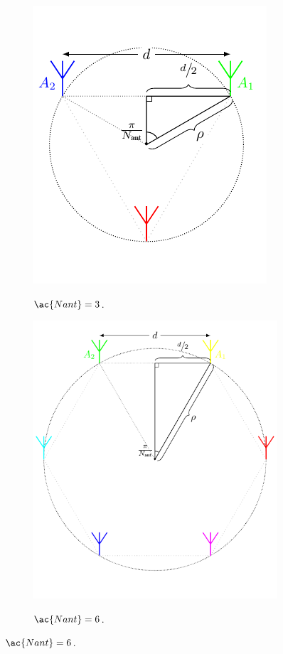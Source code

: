 \begin{figure}[htbp]
    \centering
    \caption{Diferentes distribuições de antenas.}
    \label{fig:antennas}

    \hfill
    \begin{subfigure}[c]{0.4\textwidth}
        \centering
        \caption{$ \ac{Nant} = 3 $.}
        \includegraphics{../pictures/antennas_3.pdf}
        \label{fig:antennas:3}
    \end{subfigure}
    \hfill
    \begin{subfigure}[c]{0.575\textwidth}
        \centering
        \caption{$ \ac{Nant} = 6 $.}
        \includegraphics{../pictures/antennas_6.pdf}
        \label{fig:antennas:6}
    \end{subfigure}
    \hfill


\end{figure}
